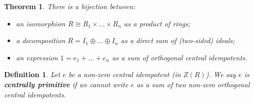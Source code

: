 \documentclass[UTF8]{ctexart}
\newtheorem*{defi}{Definition}
\newtheorem*{thm}{Theorem}
\begin{document}
\begin{enumerate}
\begin{thm}
There is a bijection between:
\begin{itemize}
  \item an isomorphism $R\cong R_1 \times \ldots \times R_n$ as a product of rings;
  \item a decomposition $R = I_1 \oplus \ldots \oplus I_n$ as a direct sum of (two-sided) ideals;
  \item an expression $1 = e_1 + \ldots + e_n$ as a sum of orthogonal central idempotents.
\end{itemize}
\end{thm}

\begin{defi}
Let $e$ be a non-zero central idempotent (in $Z(R)$). We say $e$ is \textbf{centrally primitive} if we cannot write $e$ as a sum of two non-zero orthogonal central idempotents.
\end{defi}

\end{enumerate}
\newpage
\printbibliography
\end{document}
